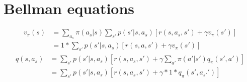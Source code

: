 \section{Bellman equations}
\begin{align*}
    v_\pi(s)&=\sum\limits_{a_s}\pi(a_s|s)\sum\limits_{s'}p(s'|s,a_s)\left[r(s,a_s,s')+\gamma v_\pi(s')\right]\\
    &=1*\sum\limits_{s'}p(s'|s,a_s)\left[r(s,a,s')+\gamma v_\pi(s')\right]
\end{align*}
\begin{align*}
    q(s, a_s)&=\sum\limits_{s'}p(s'|s,a_s)\left[r(s, a_s, s')+\gamma\sum\limits_{a'}\pi(a'|s')q_\pi(s',a')\right]\\
    &=\sum\limits_{s'}p(s'|s,a_s)\left[r(s, a_s, s')+\gamma * 1 * q_\pi(s',a_{s'}')\right]
\end{align*}
